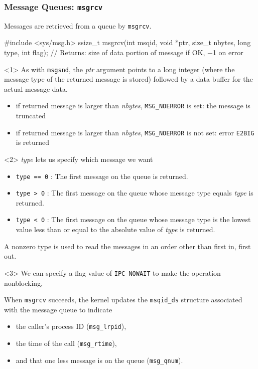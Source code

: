 \documentclass[newPxFont,sthlmFooter,nooffset]{beamer}
\begin{document}
\begin{frame}[t, fragile]
  \frametitle{Message Queues: \texttt{msgrcv}}

Messages are retrieved from a queue by \texttt{msgrcv}.
\begin{codedef}
#include <sys/msg.h>
ssize_t msgrcv(int msqid, void *ptr, size_t nbytes, long type, int flag);
// Returns: size of data portion of message if OK, −1 on error
\end{codedef}

\begin{uncoverenv}<1>
As with \texttt{msgsnd}, the \textit{ptr} argument points to a long integer (where the message type of the returned message is stored) followed by a data buffer for the actual message data.
{\footnotesize
\begin{itemize}
\item if returned message is larger than \textit{nbytes}, \texttt{MSG\_NOERROR} is set: the message is truncated
\item if returned message is larger than \textit{nbytes}, \texttt{MSG\_NOERROR} is not set: error \texttt{E2BIG} is returned
\end{itemize}
}
\end{uncoverenv}

\begin{uncoverenv}<2>
\vspace{-3.5cm}
\textit{type} lets us specify which message we want
{\footnotesize
\begin{itemize}
\item \texttt{type == 0} : The first message on the queue is returned.
\item \texttt{type > 0} : The first message on the queue whose message type equals \textit{type} is returned.
\item \texttt{type < 0} : The first message on the queue whose message type is the lowest value less than or equal to the absolute value of \textit{type} is returned.
\end{itemize}

A nonzero type is used to read the messages in an order other than first in, first out.
}
\end{uncoverenv}

\begin{uncoverenv}<3>
We can specify a flag value of \texttt{IPC\_NOWAIT} to make the operation nonblocking,

When \texttt{msgrcv} succeeds, the kernel updates the \texttt{msqid\_ds} structure associated with the message queue to indicate
\begin{itemize}
\item the caller’s process ID (\texttt{msg\_lrpid}),
\item the time of the call (\texttt{msg\_rtime}),
\item and that one less message is on the queue (\texttt{msg\_qnum}).
\end{itemize}

\end{uncoverenv}
\end{frame}
\end{document}
